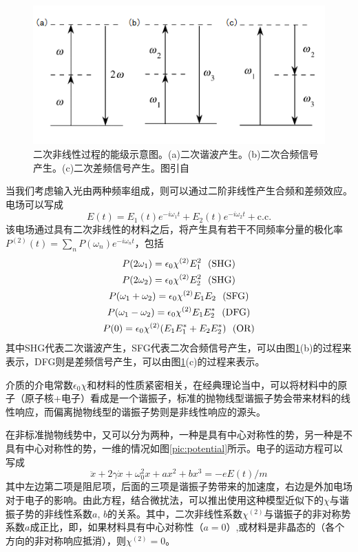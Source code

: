 \documentclass[UTF8,a4paper,cs4size,hyperref]{ctexart}
\begin{document}
\begin{figure}
\centering
\includegraphics[scale=0.8 ]{energyLevel.png}
\caption{二次非线性过程的能级示意图。(a)二次谐波产生。(b)二次合频信号产生。(c)二次差频信号产生。图引自\cite{boyd2003nonlinear}}
\label{pic:energyLevel}
\end{figure}

当我们考虑输入光由两种频率组成，则可以通过二阶非线性产生合频和差频效应。电场可以写成
\begin{equation}
E(t) = E_1(t)e^{-i\omega_1 t}+E_2(t)e^{-i\omega_2 t}+\textrm{c.c.}
\end{equation}
该电场通过具有二次非线性的材料之后，将产生具有若干不同频率分量的极化率$P^{(2)}(t) = \sum_n P(\omega_n)e^{-i\omega_nt}$，包括
\begin{gather}
P(2\omega_1) = \epsilon_0\chi^{(2)}E_1^2 \ \ \textrm{(SHG)} \notag \\
P(2\omega_2) = \epsilon_0\chi^{(2)}E_2^2\ \  \textrm{(SHG)} \notag \\
P(\omega_1+\omega_2) = \epsilon_0\chi^{(2)}E_1E_2\ \  \textrm{(SFG)}  \\
P(\omega_1-\omega_2) = \epsilon_0\chi^{(2)}E_1E_2^*\ \  \textrm{(DFG)} \notag \\
P(0) = \epsilon_0\chi^{(2)}(E_1E_1^*+E_2E_2^*)\ \  \textrm{(OR)} \notag 
\end{gather}
其中SHG代表二次谐波产生，SFG代表二次合频信号产生，可以由图\ref{pic:energyLevel}(b)的过程来表示，DFG则是差频信号产生，可以由图\ref{pic:energyLevel}(c)的过程来表示。

介质的介电常数$\epsilon_0\chi$和材料的性质紧密相关，在经典理论当中，可以将材料中的原子（原子核+电子）看成是一个谐振子，标准的抛物线型谐振子势会带来材料的线性响应，而偏离抛物线型的谐振子势则是非线性响应的源头。

在非标准抛物线势中，又可以分为两种，一种是具有中心对称性的势，另一种是不具有中心对称性的势，一维的情况如图\ref{pic:potential}所示。电子的运动方程可以写成
\begin{equation}
\ddot{x}+2\gamma\dot{x}+\omega_0^2x+ax^2+bx^3 = -eE(t)/m
\end{equation}
其中左边第二项是阻尼项，后面的三项是谐振子势带来的加速度，右边是外加电场对于电子的影响。由此方程，结合微扰法，可以推出使用这种模型近似下的$\chi$与谐振子势的非线性系数$a$, $b$的关系\cite{boyd2003nonlinear}。其中，二次非线性系数$\chi^{(2)}$与谐振子的非对称势系数$a$成正比，即，如果材料具有中心对称性（$a=0$）,或材料是非晶态的（各个方向的非对称响应抵消），则$\chi^{(2)}=0$。
\end{document}

